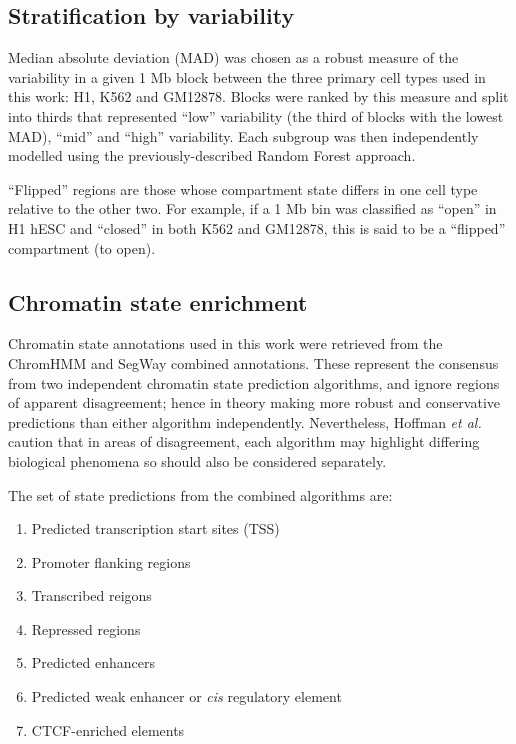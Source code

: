 \documentclass[a4paper,11pt,oneside]{book}
\begin{document}
\subsection{Stratification by variability}\label{sec:variable}

Median absolute deviation (MAD) was chosen as a robust measure of the
variability in a given 1 Mb block between the three primary cell types
used in this work: H1, K562 and GM12878. Blocks were ranked by this
measure and split into thirds that represented ``low'' variability (the
third of blocks with the lowest MAD), ``mid'' and ``high'' variability.
Each subgroup was then independently modelled using the
previously-described Random Forest approach.

``Flipped'' regions are those whose compartment state differs in one
cell type relative to the other two. For example, if a 1 Mb bin was
classified as ``open'' in H1 hESC and ``closed'' in both K562 and
GM12878, this is said to be a ``flipped'' compartment (to open).

\subsection{Chromatin state enrichment}\label{enhancer-enrichment}

Chromatin state annotations used in this work were retrieved from the ChromHMM\cite{Ernst2011} and SegWay\cite{Hoffman2012} combined annotations.\cite{Hoffman2013} These represent the consensus from two independent chromatin state prediction algorithms, and ignore regions of apparent disagreement; hence in theory making more robust and conservative predictions than either algorithm independently. Nevertheless, Hoffman \emph{et al.} caution that in areas of disagreement, each algorithm may highlight differing biological phenomena so should also be considered separately.\cite{Hoffman2013}

The set of state predictions from the combined algorithms are:
\begin{enumerate}
\item Predicted transcription start sites (TSS)
\item Promoter flanking regions
\item Transcribed reigons
\item Repressed regions
\item Predicted enhancers
\item Predicted weak enhancer or \emph{cis} regulatory element
\item CTCF-enriched elements
\end{enumerate}
\end{document}

